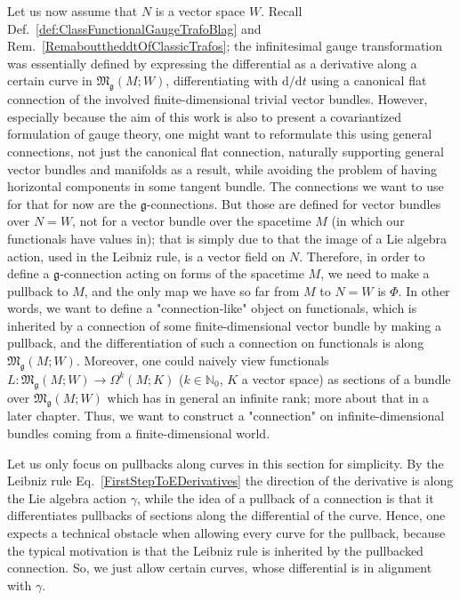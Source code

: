 Let us now assume that $N$ is a vector space $W$. Recall Def.~\ref{def:ClassFunctionalGaugeTrafoBlag} and Rem.~\ref{RemabouttheddtOfClassicTrafos}; the infinitesimal gauge transformation was essentially defined by expressing the differential as a derivative along a certain curve in $\mathfrak{M}_{\mathfrak{g}}(M; W)$, differentiating with $\mathrm{d}/\mathrm{d}t$ using a canonical flat connection of the involved finite-dimensional trivial vector bundles. However, especially because the aim of this work is also to present a covariantized formulation of gauge theory, one might want to reformulate this using general connections, not just the canonical flat connection, naturally supporting general vector bundles and manifolds as a result, while avoiding the problem of having horizontal components in some tangent bundle. The connections we want to use for that for now are the $\mathfrak{g}$-connections. But those are defined for vector bundles over $N=W$, not for a vector bundle over the spacetime $M$ (in which our functionals have values in); that is simply due to that the image of a Lie algebra action, used in the Leibniz rule, is a vector field on $N$. Therefore, in order to define a $\mathfrak{g}$-connection acting on forms of the spacetime $M$, we need to make a pullback to $M$, and the only map we have so far from $M$ to $N = W$ is $\Phi$. In other words, we want to define a "connection-like" object on functionals, which is inherited by a connection of some finite-dimensional vector bundle by making a pullback, and the differentiation of such a connection on functionals is along $\mathfrak{M}_{\mathfrak{g}}(M; W)$. Moreover, one could naively view functionals $L: \mathfrak{M}_{\mathfrak{g}}(M; W) \to \Omega^k(M; K)$ ($k \in \mathbb{N}_0$, $K$ a vector space) as sections of a bundle over $\mathfrak{M}_{\mathfrak{g}}(M; W)$ which has in general an infinite rank; more about that in a later chapter. Thus, we want to construct a "connection" on infinite-dimensional bundles coming from a finite-dimensional world.

Let us only focus on pullbacks along curves in this section for simplicity. By the Leibniz rule Eq.~\eqref{FirstStepToEDerivatives} the direction of the derivative is along the Lie algebra action $\gamma$, while the idea of a pullback of a connection is that it differentiates pullbacks of sections along the differential of the curve. Hence, one expects a technical obstacle when allowing every curve for the pullback, because the typical motivation is that the Leibniz rule is inherited by the pullbacked connection. So, we just allow certain curves, whose differential is in alignment with $\gamma$.

